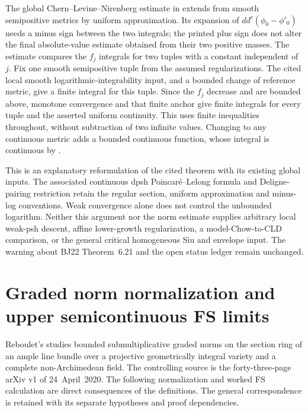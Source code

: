 The global Chern--Levine--Nirenberg estimate in
\cite[Lemma~8.6]{BE21} extends from smooth semipositive metrics
by uniform approximation.  Its expansion of
\(dd^c(\phi_0-\phi'_0)\) needs a minus sign between the two
integrals; the printed plus sign does not alter the final
absolute-value estimate obtained from their two positive masses.
The estimate compares the \(f_j\) integrals for two tuples with
a constant independent of \(j\).
Fix one smooth semipositive tuple from the assumed
regularizations.  The cited local smooth logarithmic-integrability
input, and a bounded change of reference metric, give a finite
integral for this tuple.
Since the \(f_j\) decrease and are bounded above, monotone
convergence and that finite anchor give finite integrals for
every tuple and the asserted uniform continuity.
This uses finite inequalities throughout, without subtraction
of two infinite values.
Changing to any continuous metric adds a bounded continuous
function, whose integral is continuous by
\cite[Theorem~8.4]{BE21}.

This is an explanatory reformulation of the cited theorem with
its existing global inputs.  The associated continuous dpsh
Poincar\'e--Lelong formula and Deligne-pairing restriction retain
the regular section, uniform approximation and minus-log
conventions.  Weak convergence alone does not control the
unbounded logarithm.
Neither this argument nor the norm estimate supplies arbitrary
local weak-psh descent, affine lower-growth regularization,
a model-Chow-to-CLD comparison, or the general critical
homogeneous Siu and envelope input.  The warning about BJ22
Theorem~6.21 and the open status ledger remain unchanged.

\section{Graded norm normalization and upper semicontinuous FS limits}
\label{sec:appL-graded-FS-normalization-scope}

Reboulet's \cite{Reb20AsymptoticFSV1} studies bounded submultiplicative
graded norms on the section ring of an ample line bundle over a
projective geometrically integral variety and a complete
non-Archimedean field. The controlling source is the forty-three-page
arXiv v1 of 24~April~2020. The following normalization and worked
FS calculation are direct consequences of the definitions.
The general correspondence is retained with its separate hypotheses
and proof dependencies.


